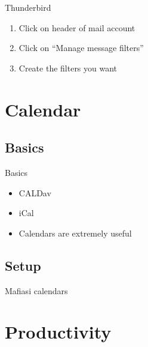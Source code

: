 \documentclass{beamer}
\begin{document}
	\begin{frame}{Thunderbird}
		\begin{enumerate}
			\item Click on header of mail account
			\item Click on ``Manage message filters''
			\item Create the filters you want
		\end{enumerate}
	\end{frame}
	
	\section{Calendar}
	\subsection{Basics}
	\begin{frame}{Basics}
		\begin{itemize}
			\item CALDav
			\item iCal
			\item Calendars are extremely useful
		\end{itemize}
	\end{frame}	
	
	\subsection{Setup}
	\begin{frame}{Mafiasi calendars}
		
	\end{frame}	
	
	\section{Productivity}
\end{document}
